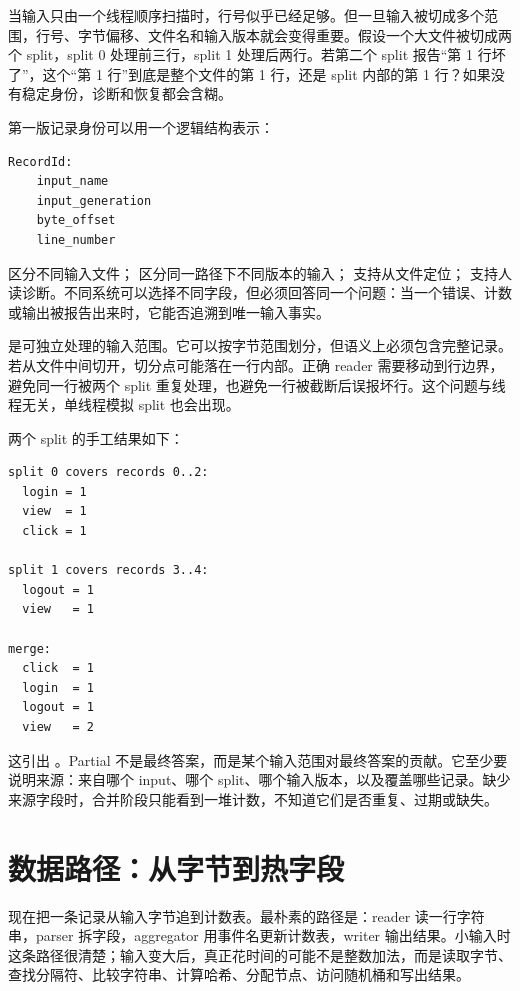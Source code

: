 当输入只由一个线程顺序扫描时，行号似乎已经足够。但一旦输入被切成多个范围，行号、字节偏移、文件名和输入版本就会变得重要。假设一个大文件被切成两个 split，split 0 处理前三行，split 1 处理后两行。若第二个 split 报告“第 1 行坏了”，这个“第 1 行”到底是整个文件的第 1 行，还是 split 内部的第 1 行？如果没有稳定身份，诊断和恢复都会含糊。

第一版记录身份可以用一个逻辑结构表示：

\begin{lstlisting}[numbers=none,caption={记录身份的伪结构}]
RecordId:
    input_name
    input_generation
    byte_offset
    line_number
\end{lstlisting}

 区分不同输入文件； 区分同一路径下不同版本的输入； 支持从文件定位； 支持人读诊断。不同系统可以选择不同字段，但必须回答同一个问题：当一个错误、计数或输出被报告出来时，它能否追溯到唯一输入事实。

 是可独立处理的输入范围。它可以按字节范围划分，但语义上必须包含完整记录。若从文件中间切开，切分点可能落在一行内部。正确 reader 需要移动到行边界，避免同一行被两个 split 重复处理，也避免一行被截断后误报坏行。这个问题与线程无关，单线程模拟 split 也会出现。

两个 split 的手工结果如下：

\begin{lstlisting}[numbers=none,caption={两个 split 的局部贡献}]
split 0 covers records 0..2:
  login = 1
  view  = 1
  click = 1

split 1 covers records 3..4:
  logout = 1
  view   = 1

merge:
  click  = 1
  login  = 1
  logout = 1
  view   = 2
\end{lstlisting}

这引出 。Partial 不是最终答案，而是某个输入范围对最终答案的贡献。它至少要说明来源：来自哪个 input、哪个 split、哪个输入版本，以及覆盖哪些记录。缺少来源字段时，合并阶段只能看到一堆计数，不知道它们是否重复、过期或缺失。

\section{数据路径：从字节到热字段}

现在把一条记录从输入字节追到计数表。最朴素的路径是：reader 读一行字符串，parser 拆字段，aggregator 用事件名更新计数表，writer 输出结果。小输入时这条路径很清楚；输入变大后，真正花时间的可能不是整数加法，而是读取字节、查找分隔符、比较字符串、计算哈希、分配节点、访问随机桶和写出结果。

